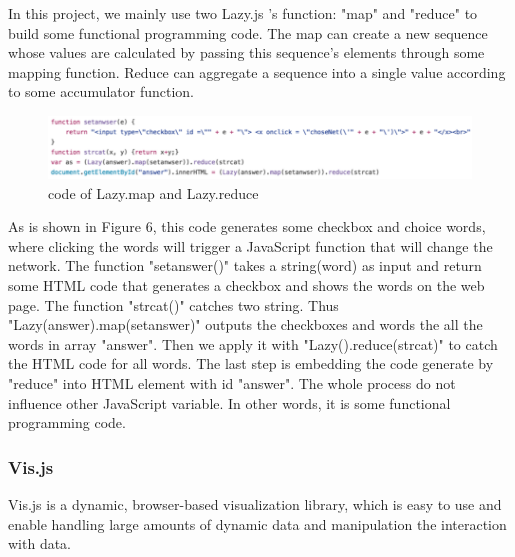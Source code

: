 In this project, we mainly use two Lazy.js 's function: "map" and "reduce" to build some functional programming code. The map can create a new sequence whose values are calculated by passing this sequence's elements through some mapping function.  
Reduce can aggregate a sequence into a single value according to some accumulator function. 
\begin{figure}[h]
\centering
		\includegraphics[width=\linewidth]{figure/mapreduce}
	\caption{code of Lazy.map and Lazy.reduce}
	\label{fig:mapreduce}
\end{figure}

As is shown in Figure 6, this code generates some checkbox and choice words,  where clicking the words will trigger a JavaScript function that will change the network. 
The function "setanswer()" takes a string(word) as input and return some HTML code that generates a checkbox and shows the words on the web page. The function "strcat()" catches two string. Thus "Lazy(answer).map(setanswer)" outputs the checkboxes and words the all the words in array "answer". Then we apply it with "Lazy().reduce(strcat)" to catch the HTML code for all words. The last step is embedding the code generate by "reduce" into HTML element with id "answer". The whole process do not influence other JavaScript variable. In other words, it is some functional programming code.

\subsubsection{Vis.js}
Vis.js is a dynamic, browser-based visualization library, which is easy to use and enable handling large amounts of dynamic data and manipulation the interaction with data.


